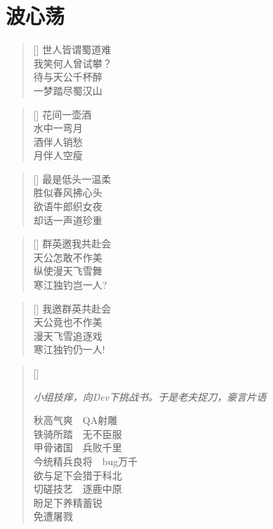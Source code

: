 \chapter{波心荡}
\thispagestyle{empty}

\renewcommand{\poemtoc}{section}
\settowidth{\versewidth}{世人皆谓蜀道难}
\begin{verse}[\versewidth]
世人皆谓蜀道难\\
我笑何人曾试攀？\\
待与天公千杯醉\\
一梦踏尽蜀汉山
\end{verse}

\renewcommand{\poemtoc}{section}
\settowidth{\versewidth}{花间一壶酒}
\begin{verse}[\versewidth]
花间一壶酒\\
水中一弯月\\
酒伴人销愁\\
月伴人空瘦
\end{verse}

\renewcommand{\poemtoc}{section}
\settowidth{\versewidth}{最是低头一温柔}
\begin{verse}[\versewidth]
最是低头一温柔\\
胜似春风拂心头\\
欲语牛郎织女夜\\
却话一声道珍重
\end{verse}

\renewcommand{\poemtoc}{section}
\settowidth{\versewidth}{群英邀我共赴会}
\begin{verse}[\versewidth]
群英邀我共赴会\\
天公怎敢不作美\\
纵使漫天飞雪舞\\
寒江独钓岂一人?
\end{verse}

\renewcommand{\poemtoc}{section}
\settowidth{\versewidth}{群英邀我共赴会}
\begin{verse}[\versewidth]
我邀群英共赴会\\
天公竟也不作美\\
漫天飞雪追逐戏\\
寒江独钓仍一人!
\end{verse}

\renewcommand{\poemtoc}{section}
\settowidth{\versewidth}{秋高气爽 QA射雕}
\begin{verse}[\versewidth]

\emph{\scriptsize{小组技痒，向Dev下挑战书。于是老夫捉刀，豪言片语}}

秋高气爽\ \ QA射雕\\
铁骑所踏\ \ 无不臣服\\
甲骨诸国\ \ 兵败千里\\
今统精兵良将\ \ bug万千\\
欲与足下会猎于科北\\
切磋技艺\ \ 逐鹿中原\\
盼足下养精蓄锐\\
免遭屠戮 
\end{verse}

